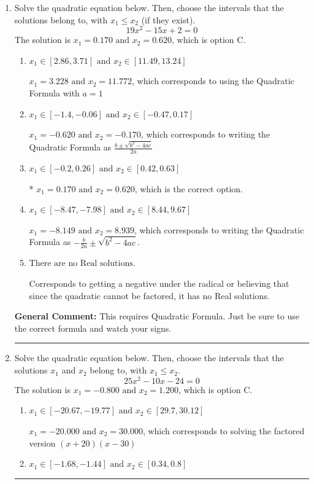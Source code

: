 \documentclass{extbook}[14pt]
\newcommand{\litem}[1]{\item #1

\rule{\textwidth}{0.4pt}}
\begin{document}
\begin{enumerate}\litem{
Solve the quadratic equation below. Then, choose the intervals that the solutions belong to, with $x_1 \leq x_2$ (if they exist).
\[ 19x^{2} -15 x + 2 = 0 \]The solution is \( x_1 = 0.170 \text{ and } x_2 = 0.620 \), which is option C.\begin{enumerate}[label=\Alph*.]
\item \( x_1 \in [2.86, 3.71] \text{ and } x_2 \in [11.49, 13.24] \)

 $x_1 = 3.228 \text{ and } x_2 = 11.772$, which corresponds to using the Quadratic Formula with $a=1$
\item \( x_1 \in [-1.4, -0.06] \text{ and } x_2 \in [-0.47, 0.17] \)

 $x_1 = -0.620 \text{ and } x_2 = -0.170$, which corresponds to writing the Quadratic Formula as $\frac{b \pm \sqrt{b^2 - 4ac}}{2a}$
\item \( x_1 \in [-0.2, 0.26] \text{ and } x_2 \in [0.42, 0.63] \)

* $x_1 = 0.170 \text{ and } x_2 = 0.620$, which is the correct option.
\item \( x_1 \in [-8.47, -7.98] \text{ and } x_2 \in [8.44, 9.67] \)

 $x_1 = -8.149 \text{ and } x_2 = 8.939$, which corresponds to writing the Quadratic Formula as $-\frac{b}{2a} \pm \sqrt{b^2 - 4ac}$.
\item \( \text{There are no Real solutions.} \)

Corresponds to getting a negative under the radical or believing that since the quadratic cannot be factored, it has no Real solutions.
\end{enumerate}

\textbf{General Comment:} This requires Quadratic Formula. Just be sure to use the correct formula and watch your signs.
}
\litem{
Solve the quadratic equation below. Then, choose the intervals that the solutions $x_1$ and $x_2$ belong to, with $x_1 \leq x_2$.
\[ 25x^{2} -10 x -24 = 0 \]The solution is \( x_1 = -0.800 \text{ and } x_2 = 1.200 \), which is option C.\begin{enumerate}[label=\Alph*.]
\item \( x_1 \in [-20.67, -19.77] \text{ and } x_2 \in [29.7, 30.12] \)

$x_1 = -20.000 \text{ and } x_2 = 30.000$, which corresponds to solving the factored version $(x + 20)(x -30)$
\item \( x_1 \in [-1.68, -1.44] \text{ and } x_2 \in [0.34, 0.8] \)


\end{enumerate}}
\end{enumerate}
\end{document}
